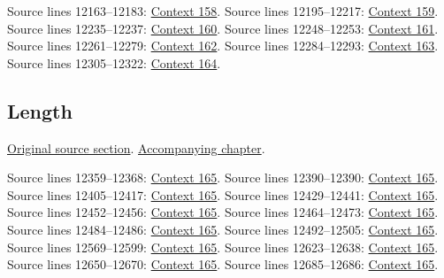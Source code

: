 \begin{AlgebraSourceRoutes}
 Source lines 12163--12183: \hyperlink{algebra-context-158}{Context 158}.
 Source lines 12195--12217: \hyperlink{algebra-context-159}{Context 159}.
 Source lines 12235--12237: \hyperlink{algebra-context-160}{Context 160}.
 Source lines 12248--12253: \hyperlink{algebra-context-161}{Context 161}.
 Source lines 12261--12279: \hyperlink{algebra-context-162}{Context 162}.
 Source lines 12284--12293: \hyperlink{algebra-context-163}{Context 163}.
 Source lines 12305--12322: \hyperlink{algebra-context-164}{Context 164}.
\end{AlgebraSourceRoutes}

\subsection{Length}
\hypertarget{algebra-source-section-length}{}
\noindent\href{https://github.com/stacks/stacks-project/blob/a04446e57ec1fbc252a871afcec7752fb2807b14/algebra.tex\#L12346}{Original source section}. \href{algebra.pdf\#nameddest=section-length}{Accompanying chapter}.

\begin{AlgebraSourceRoutes}
 Source lines 12359--12368: \hyperlink{algebra-context-165}{Context 165}.
 Source lines 12390--12390: \hyperlink{algebra-context-165}{Context 165}.
 Source lines 12405--12417: \hyperlink{algebra-context-165}{Context 165}.
 Source lines 12429--12441: \hyperlink{algebra-context-165}{Context 165}.
 Source lines 12452--12456: \hyperlink{algebra-context-165}{Context 165}.
 Source lines 12464--12473: \hyperlink{algebra-context-165}{Context 165}.
 Source lines 12484--12486: \hyperlink{algebra-context-165}{Context 165}.
 Source lines 12492--12505: \hyperlink{algebra-context-165}{Context 165}.
 Source lines 12569--12599: \hyperlink{algebra-context-165}{Context 165}.
 Source lines 12623--12638: \hyperlink{algebra-context-165}{Context 165}.
 Source lines 12650--12670: \hyperlink{algebra-context-165}{Context 165}.
 Source lines 12685--12686: \hyperlink{algebra-context-165}{Context 165}.
\end{AlgebraSourceRoutes}

